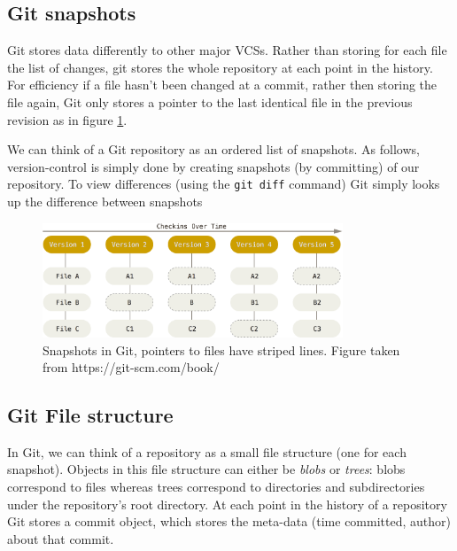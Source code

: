 \documentclass[12pt,twoside,notitlepage]{report}
\begin{document}
\subsection{Git snapshots}

Git stores data differently to other major VCSs. Rather than storing for each file the list of changes, git stores the whole repository at each  point in the history. For efficiency if a file hasn't been changed at a commit, rather then storing the file again, Git only stores a pointer to the last identical file in the previous revision as in figure \ref{snapshot_git}.

We can think of a Git repository as an ordered list of snapshots. As follows, version-control is simply done by creating snapshots (by committing) of our repository. To view differences (using the \texttt{git diff} command) Git simply looks up the difference between snapshots
\begin{figure}[h]
\includegraphics[width=0.8\textwidth]{snapshots_git.png}
\centering
\captionsetup{width=0.8\textwidth}

\caption[Snapshots in Git]{Snapshots in Git, pointers to files have striped lines. Figure taken from https://git-scm.com/book/}
\label{snapshot_git}
\end{figure}
\subsection{Git File structure}
In Git, we can think of a repository as a small file structure (one for each snapshot). Objects in this file structure can either be \textit{blobs} or \textit{trees}: blobs correspond to files whereas trees correspond to directories and subdirectories under the repository's root directory. At each point in the history of a repository Git stores a commit object, which stores the meta-data (time committed, author) about that commit.
\end{document}
